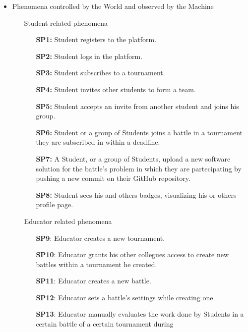 \documentclass{article}
\newcounter{subsubsubsection}[subsubsection]
\begin{document}
\begin{itemize}
    \item Phenomena controlled by the World and observed by the Machine
          \begin{enumerate}
              \item[\ding{228}] Student related phenomena
                    \begin{enumerate}
                        \item[\textbf{SP1:}] Student registers to the platform.
                        \item[\textbf{SP2:}] Student logs in the platform.
                        \item[\textbf{SP3:}] Student subscribes to a tournament.
                        \item[\textbf{SP4:}] Student invites other students to form a team.
                        \item[\textbf{SP5:}] Student accepts an invite from another student and joins his group.
                        \item[\textbf{SP6:}] Student or a group of Students joins a battle in a tournament they are subscribed in within a deadline.
                        \item[\textbf{SP7:}] A Student, or a group of Students, upload a new software solution for the battle's problem
                        in which they are partecipating by pushing a new commit on their GitHub repository. 
                        \item[\textbf{SP8:}] Student sees his and others badges, visualizing his or others profile page.
                    \end{enumerate}
              \item[\ding{228}] Educator related phenomena
                    \begin{enumerate}
                        \item[\textbf{SP9}:] Educator creates a new tournament.
                        \item[\textbf{SP10}:] Educator grants his other collegues access to create new battles within a tournament he created.
                        \item[\textbf{SP11}:] Educator creates a new battle.
                        \item[\textbf{SP12}:] Educator sets a battle's settings while creating one.
                        \item[\textbf{SP13}:] Educator manually evaluates the work done by Students in a certain battle of a certain tournament during

\end{enumerate}
\end{enumerate}
\end{itemize}
\end{document}

